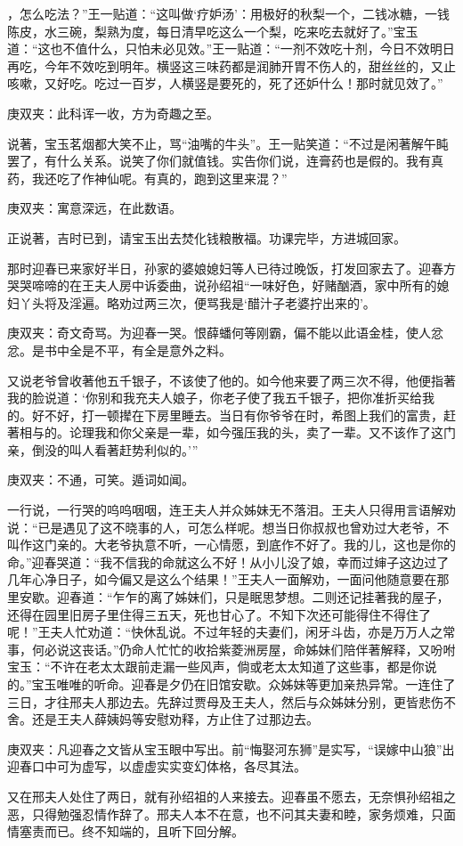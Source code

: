 \begin{parag}
，怎么吃法？”王一贴道：“这叫做‘疗妒汤’：用极好的秋梨一个，二钱冰糖，一钱陈皮，水三碗，梨熟为度，每日清早吃这么一个梨，吃来吃去就好了。”宝玉道：“这也不值什么，只怕未必见效。”王一贴道：“一剂不效吃十剂，今日不效明日再吃，今年不效吃到明年。横竖这三味药都是润肺开胃不伤人的，甜丝丝的，又止咳嗽，又好吃。吃过一百岁，人横竖是要死的，死了还妒什么！那时就见效了。”\begin{note}庚双夹：此科诨一收，方为奇趣之至。\end{note}说著，宝玉茗烟都大笑不止，骂“油嘴的牛头”。王一贴笑道：“不过是闲著解午盹罢了，有什么关系。说笑了你们就值钱。实告你们说，连膏药也是假的。我有真药，我还吃了作神仙呢。有真的，跑到这里来混？”\begin{note}庚双夹：寓意深远，在此数语。\end{note}正说著，吉时已到，请宝玉出去焚化钱粮散福。功课完毕，方进城回家。
\end{parag}


\begin{parag}
    那时迎春已来家好半日，孙家的婆娘媳妇等人已待过晚饭，打发回家去了。迎春方哭哭啼啼的在王夫人房中诉委曲，说孙绍祖“一味好色，好赌酗酒，家中所有的媳妇丫头将及淫遍。略劝过两三次，便骂我是‘醋汁子老婆拧出来的’。\begin{note}庚双夹：奇文奇骂。为迎春一哭。恨薛蟠何等刚霸，偏不能以此语金桂，使人忿忿。是书中全是不平，有全是意外之料。\end{note}又说老爷曾收著他五千银子，不该使了他的。如今他来要了两三次不得，他便指著我的脸说道：‘你别和我充夫人娘子，你老子使了我五千银子，把你准折买给我的。好不好，打一顿撵在下房里睡去。当日有你爷爷在时，希图上我们的富贵，赶著相与的。论理我和你父亲是一辈，如今强压我的头，卖了一辈。又不该作了这门亲，倒没的叫人看著赶势利似的。’”\begin{note}庚双夹：不通，可笑。遁词如闻。\end{note}一行说，一行哭的呜呜咽咽，连王夫人并众姊妹无不落泪。王夫人只得用言语解劝说：“已是遇见了这不晓事的人，可怎么样呢。想当日你叔叔也曾劝过大老爷，不叫作这门亲的。大老爷执意不听，一心情愿，到底作不好了。我的儿，这也是你的命。”迎春哭道：“我不信我的命就这么不好！从小儿没了娘，幸而过婶子这边过了几年心净日子，如今偏又是这么个结果！”王夫人一面解劝，一面问他随意要在那里安歇。迎春道：“乍乍的离了姊妹们，只是眠思梦想。二则还记挂著我的屋子，还得在园里旧房子里住得三五天，死也甘心了。不知下次还可能得住不得住了呢！”王夫人忙劝道：“快休乱说。不过年轻的夫妻们，闲牙斗齿，亦是万万人之常事，何必说这丧话。”仍命人忙忙的收拾紫菱洲房屋，命姊妹们陪伴著解释，又吩咐宝玉：“不许在老太太跟前走漏一些风声，倘或老太太知道了这些事，都是你说的。”宝玉唯唯的听命。迎春是夕仍在旧馆安歇。众姊妹等更加亲热异常。一连住了三日，才往邢夫人那边去。先辞过贾母及王夫人，然后与众姊妹分别，更皆悲伤不舍。还是王夫人薛姨妈等安慰劝释，方止住了过那边去。\begin{note}庚双夹：凡迎春之文皆从宝玉眼中写出。前“悔娶河东狮”是实写，“误嫁中山狼”出迎春口中可为虚写，以虚虚实实变幻体格，各尽其法。\end{note}又在邢夫人处住了两日，就有孙绍祖的人来接去。迎春虽不愿去，无奈惧孙绍祖之恶，只得勉强忍情作辞了。邢夫人本不在意，也不问其夫妻和睦，家务烦难，只面情塞责而已。终不知端的，且听下回分解。
\end{parag}


